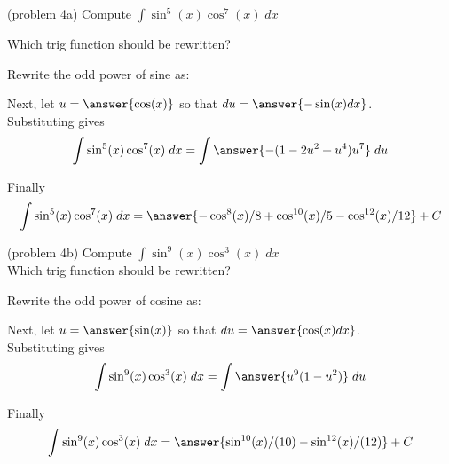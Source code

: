 \documentclass[handout]{ximera}
\begin{document}
\begin{problem}{\color{gray}(problem 4a)}
Compute $\displaystyle{\int \sin^5(x)\cos^7(x) \; dx}$

Which trig function should be rewritten?

\begin{multipleChoice}
\end{multipleChoice}

Rewrite the odd power of sine as:
\begin{multipleChoice}
\end{multipleChoice}

Next, let $u = \answer{\cos(x)}$ so that $du = \answer{-\sin(x) dx}$.\\

Substituting gives
\[
\int \sin^5(x)\cos^7(x) \; dx= \int \answer{-(1-2u^2 + u^4)u^7} \; du
\]

Finally
\[
\int \sin^5(x)\cos^7(x) \; dx= \answer{-\cos^8(x)/8 + \cos^{10}(x)/5 - \cos^{12}(x)/12} + C
\]
\end{problem}



\begin{problem}(problem 4b)
Compute $\displaystyle{\int \sin^9(x)\cos^3(x) \; dx}$\\

Which trig function should be rewritten?
\begin{multipleChoice}
\end{multipleChoice}

Rewrite the odd power of cosine as:
\begin{multipleChoice}
\end{multipleChoice}

Next, let $u = \answer{\sin(x)}$ so that $du = \answer{\cos(x) dx}$.\\

Substituting gives
\[
\int \sin^9(x)\cos^3(x) \; dx= \int \answer{u^9(1 - u^2)} \; du
\]

Finally
\[
\int \sin^9(x)\cos^3(x) \; dx= \answer{\sin^{10}(x)/(10) - \sin^{12}(x)/(12) } + C
\]
\end{problem}
\end{document}
